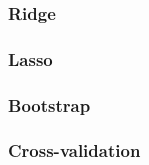 \subsubsection{Ridge}\label{sssec:ridge_terrain}


\subsubsection{Lasso}\label{sssec:lasso_terrain}


\subsubsection{Bootstrap}\label{sssec:bootstrap_terrain}


\subsubsection{Cross-validation}\label{sssec:crossval_terrain}